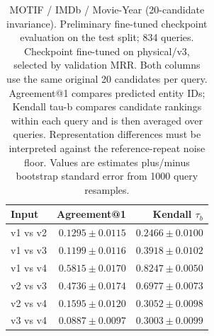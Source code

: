 \begin{table}[t]
\centering
\small
\begin{tabular}{lrr}
\toprule
Input & Agreement@1 & Kendall $\tau_b$ \\
\midrule
v1 vs v2 & $0.1295 \pm 0.0115$ & $0.2466 \pm 0.0100$ \\
v1 vs v3 & $0.1199 \pm 0.0116$ & $0.3918 \pm 0.0102$ \\
v1 vs v4 & $0.5815 \pm 0.0170$ & $0.8247 \pm 0.0050$ \\
v2 vs v3 & $0.4736 \pm 0.0174$ & $0.6977 \pm 0.0073$ \\
v2 vs v4 & $0.1595 \pm 0.0120$ & $0.3052 \pm 0.0098$ \\
v3 vs v4 & $0.0887 \pm 0.0097$ & $0.3003 \pm 0.0099$ \\
\bottomrule
\end{tabular}
\caption{MOTIF / IMDb / Movie-Year (20-candidate invariance). Preliminary fine-tuned checkpoint evaluation on the test split; 834 queries. Checkpoint fine-tuned on physical/v3, selected by validation MRR. Both columns use the same original 20 candidates per query. Agreement@1 compares predicted entity IDs; Kendall tau-b compares candidate rankings within each query and is then averaged over queries. Representation differences must be interpreted against the reference-repeat noise floor. Values are estimates plus/minus bootstrap standard error from 1000 query resamples.}
\label{tab:motif-movie_year-invariance}
\end{table}
